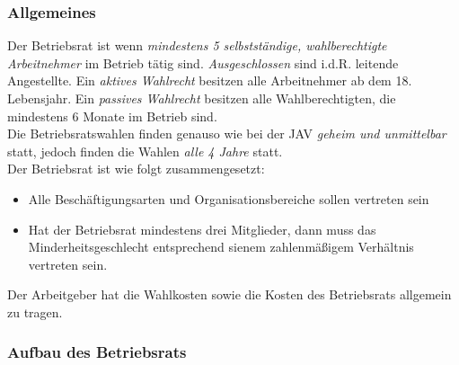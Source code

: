 \documentclass[a4paper, 12pt]{report}
\begin{document}
\subsubsection{Allgemeines}

Der Betriebsrat ist wenn \emph{mindestens 5 selbstständige, wahlberechtigte 
Arbeitnehmer} im Betrieb tätig sind. \emph{Ausgeschlossen} sind i.d.R. leitende 
Angestellte. Ein \emph{aktives Wahlrecht} besitzen alle Arbeitnehmer ab dem 18.
Lebensjahr. Ein \emph{passives Wahlrecht} besitzen alle Wahlberechtigten, die 
mindestens 6 Monate im Betrieb sind. \\

Die Betriebsratswahlen finden genauso wie bei der JAV \emph{geheim und 
unmittelbar} statt, jedoch finden die Wahlen \emph{alle 4 Jahre} statt. \\

Der Betriebsrat ist wie folgt zusammengesetzt: 

\begin{itemize}
    \item Alle Beschäftigungsarten und Organisationsbereiche sollen vertreten 
        sein
    \item Hat der Betriebsrat mindestens drei Mitglieder, dann muss das 
        Minderheitsgeschlecht entsprechend sienem zahlenmäßigem Verhältnis 
        vertreten sein. 
\end{itemize}

Der Arbeitgeber hat die Wahlkosten sowie die Kosten des Betriebsrats allgemein
zu tragen. \\

\subsubsection{Aufbau des Betriebsrats}
\end{document}
